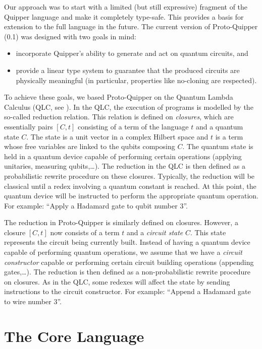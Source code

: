 \documentclass{article}
\begin{document}
Our approach was to start with a limited (but still expressive) 
fragment of the Quipper language and make it completely type-safe. 
This provides a basis for extension to the full language in the 
future. The current version of Proto-Quipper (0.1) was designed 
with two goals in mind: 
\begin{itemize}
  \item incorporate Quipper's ability to generate and act on 
  quantum circuits, and 
  \item provide a linear type system to guarantee that the 
  produced circuits are physically meaningful (in particular, 
  properties like no-cloning are respected).
\end{itemize}
To achieve these goals, we based Proto-Quipper on the Quantum 
Lambda Calculus (QLC, see \cite{SeVa09}). In the QLC, the execution 
of programs is modelled by the so-called reduction relation. This 
relation is defined on \emph{closures}, which are 
essentially pairs $[C,t]$ consisting of a term of the language 
$t$ and a quantum state $C$. The state is a unit vector in a 
complex Hilbert space and $t$ is a term whose free variables are 
linked to the qubits composing $C$. The quantum state is held in 
a quantum device capable of performing certain operations 
(applying unitaries, measuring qubits,\ldots). The reduction in 
the QLC is then defined as a probabilistic rewrite procedure on 
these closures. Typically, the reduction will be classical until 
a redex involving a quantum constant is reached. At this point, 
the quantum device will be instructed to perform the appropriate 
quantum operation. For example: ``Apply a Hadamard gate to qubit 
number 3''. 

The reduction in Proto-Quipper is similarly defined on closures. 
However, a closure $[C,t]$ now consists of a term $t$ and a 
\emph{circuit state} $C$. This state represents the circuit being 
currently built. Instead of having a quantum device capable of 
performing quantum operations, we assume that we have a 
\emph{circuit constructor} capable or performing certain circuit 
building operations (appending gates,\ldots). The reduction is 
then defined as a non-probabilistic rewrite procedure on closures. 
As in the QLC, some redexes will affect the state by sending 
instructions to the circuit constructor. For example: ``Append a 
Hadamard gate to wire number 3''.


\section{The Core Language}
\end{document}
